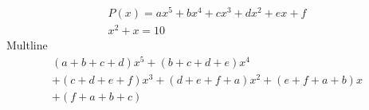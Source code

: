 \documentclass[a4paper]{article}
\begin{document}
\begin{gather}
P(x)=ax^{5}+bx^{4}+cx^{3}+dx^{2}+ex +f\\
x^2+x=10
\end{gather}
Multline
\begin{multline*}
(a+b+c+d)x^{5}+(b+c+d+e)x^{4} \\
+(c+d+e+f)x^{3}+(d+e+f+a)x^{2}+(e+f+a+b)x\\
+ (f+a+b+c)
\end{multline*}
\end{document}

